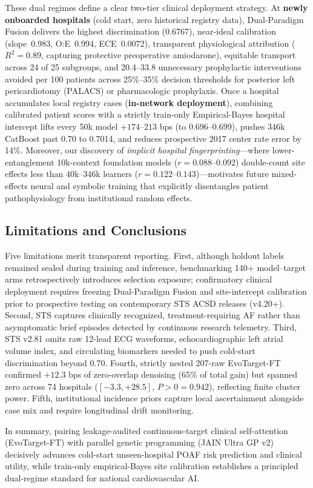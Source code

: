 These dual regimes define a clear two-tier clinical deployment strategy. At \textbf{newly onboarded hospitals} (cold start, zero historical registry data), Dual-Paradigm Fusion delivers the highest discrimination (0.6767), near-ideal calibration (slope~0.983, O:E~0.994, ECE~0.0072), transparent physiological attribution ($R^2 = 0.89$, capturing protective preoperative amiodarone), equitable transport across 24 of 25 subgroups, and 20.4--33.8 unnecessary prophylactic interventions avoided per 100 patients across 25\%--35\% decision thresholds for posterior left pericardiotomy (PALACS\cite{gaudino2021palacs}) or pharmacologic prophylaxis. Once a hospital accumulates local registry cases (\textbf{in-network deployment}), combining calibrated patient scores with a strictly train-only Empirical-Bayes hospital intercept lifts every 50k model $+174$--$213$ bps (to 0.696--0.699), pushes 346k CatBoost past 0.70 to 0.7014, and reduces prospective 2017 center rate error by 14\%. Moreover, our discovery of \emph{implicit hospital fingerprinting}---where lower-entanglement 10k-context foundation models ($r=0.088$--$0.092$) double-count site effects less than 40k--346k learners ($r=0.122$--$0.143$)---motivates future mixed-effects neural and symbolic training that explicitly disentangles patient pathophysiology from institutional random effects.

\subsection{Limitations and Conclusions}
Five limitations merit transparent reporting. First, although holdout labels remained sealed during training and inference, benchmarking 140+ model--target arms retrospectively introduces selection exposure; confirmatory clinical deployment requires freezing Dual-Paradigm Fusion and site-intercept calibration prior to prospective testing on contemporary STS ACSD releases (v4.20+). Second, STS  captures clinically recognized, treatment-requiring AF rather than asymptomatic brief episodes detected by continuous research telemetry.\cite{filardo2017telemetry,perezgrovas2023jaha} Third, STS v2.81 omits raw 12-lead ECG waveforms, echocardiographic left atrial volume index, and circulating biomarkers needed to push cold-start discrimination beyond 0.70.\cite{han2025aiecg,khalpey2026digital} Fourth, strictly nested 207-raw EvoTarget-FT confirmed $+12.3$ bps of zero-overlap denoising (65\% of total gain) but spanned zero across 74 hospitals ($[-3.3, +28.5]$, $P>0=0.942$), reflecting finite cluster power. Fifth, institutional incidence priors capture local ascertainment alongside case mix and require longitudinal drift monitoring.

In summary, pairing leakage-audited continuous-target clinical self-attention (EvoTarget-FT) with parallel genetic programming (JAIN Ultra GP v2) decisively advances cold-start unseen-hospital POAF risk prediction and clinical utility, while train-only empirical-Bayes site calibration establishes a principled dual-regime standard for national cardiovascular AI.
